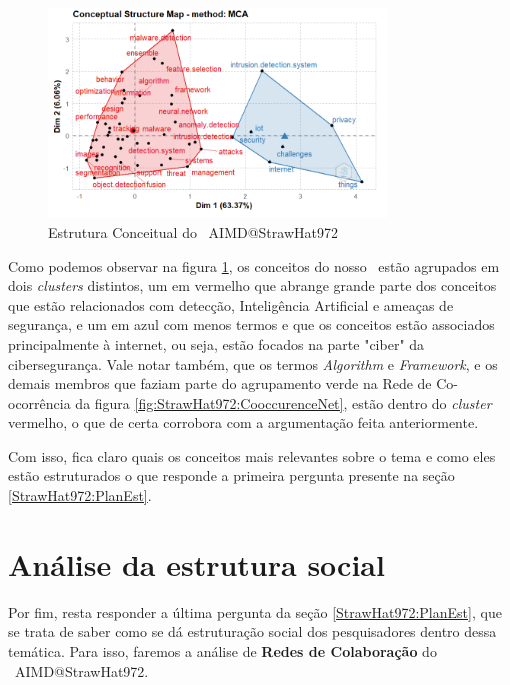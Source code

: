 \begin{figure}[H]
    \centering
    \includegraphics[width=0.8\textwidth]{experiments/StrawHat972/PesqBibliogr/IA-DeteccaoMalware/WoS-20220209/Imagens/AIMDFactorialAnalysis.png}
    \caption{Estrutura Conceitual do \dataset\ AIMD@StrawHat972}
    \label{fig:StrawHat972:FactorialAnalysis}
\end{figure}

Como podemos observar na figura \ref{fig:StrawHat972:FactorialAnalysis}, os conceitos do nosso \dataset\ estão agrupados em dois \textit{clusters} distintos, um em vermelho que abrange grande parte dos conceitos que estão relacionados com detecção, Inteligência Artificial e ameaças de segurança, e um em azul com menos termos e que os conceitos estão associados principalmente à internet, ou seja, estão focados na parte "ciber" da cibersegurança. Vale notar também, que os termos \textit{Algorithm} e \textit{Framework}, e os demais membros que faziam parte do agrupamento verde na Rede de Co-ocorrência da figura \ref{fig:StrawHat972:CooccurenceNet}, estão dentro do \textit{cluster} vermelho, o que de certa corrobora com a argumentação feita anteriormente.

Com isso, fica claro quais os conceitos mais relevantes sobre o tema e como eles estão estruturados o que responde a primeira pergunta presente na seção \ref{StrawHat972:PlanEst}.

\section{Análise da estrutura social}

Por fim, resta responder a última pergunta da seção \ref{StrawHat972:PlanEst}, que se trata de saber como se dá estruturação social dos pesquisadores dentro dessa temática. Para isso, faremos a análise de \textbf{Redes de Colaboração} do \dataset\ AIMD@StrawHat972.

